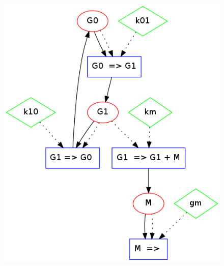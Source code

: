 \documentclass[letterpaper]{article}
\begin{document}
\begin{figure}[H]
  \begin{minipage}[b]{0.48\linewidth}
    \centering
    \includegraphics[scale=0.25]{figures/rna1.png}
  \end{minipage}
  \begin{minipage}[b]{0.48\linewidth}
    \centering

\end{minipage}
\end{figure}
\end{document}
